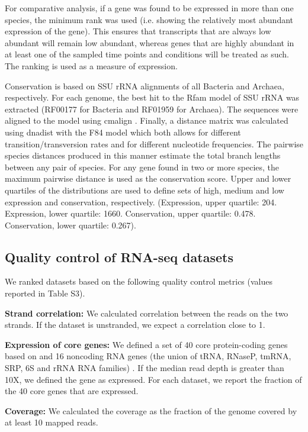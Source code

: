 \documentclass[10pt]{article}
\begin{document}
For comparative analysis, if a gene was found to be expressed in more
than one species, the minimum rank was used (i.e. showing the
relatively most abundant expression of the gene). This ensures that
transcripts that are always low abundant will remain low abundant,
whereas genes that are highly abundant in at least one of the sampled
time points and conditions will be treated as such. The ranking is
used as a measure of expression.

Conservation is based on SSU rRNA alignments of all Bacteria and
Archaea, respectively. For each genome, the best hit to the Rfam model
of SSU rRNA was extracted (RF00177 for Bacteria and RF01959 for
Archaea). The sequences were aligned to the model using cmalign
\cite{Nawrocki:2013}. Finally, a distance matrix was calculated using
dnadist \cite{FELS05} with the F84 model
\cite{Kishino:1989,Felsenstein:1996} which both allows for different
transition/transversion rates and for different nucleotide
frequencies. The pairwise species distances produced in this manner
estimate the total branch lengths between any pair of species. For any
gene found in two or more species, the maximum pairwise distance is
used as the conservation score. Upper and lower quartiles of the
distributions are used to define sets of high, medium and low
expression and conservation, respectively. (Expression, upper
quartile: 204. Expression, lower quartile: 1660. Conservation, upper
quartile: 0.478. Conservation, lower quartile: 0.267).

\subsection*{Quality control of RNA-seq datasets}

We ranked datasets based on the following quality control metrics
(values reported in Table S3).
	
{\bf Strand correlation:} We calculated correlation between the reads
on the two strands. If the dataset is unstranded, we expect a
correlation close to 1.
	
{\bf Expression of core genes:} We defined a set of 40 core
protein-coding genes based on \cite{Wu:2013,Darling:2014} and 16 noncoding RNA
genes (the union of tRNA, RNaseP, tmRNA, SRP, 6S and rRNA RNA
families) \cite{Gardner:2011,Burge:2013}. If the median read depth is
greater than 10X, we defined the gene as expressed. For each dataset,
we report the fraction of the 40 core genes that are expressed.
	
{\bf Coverage:} We calculated the coverage as the fraction of the
genome covered by at least 10 mapped reads.
	
\end{document}
